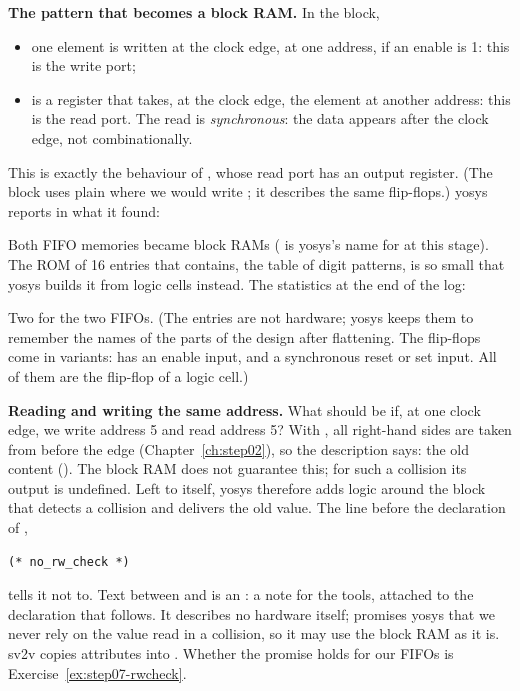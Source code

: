 \textbf{The pattern that becomes a block RAM.} In the  block,
\begin{itemize}
\item one element is written at the clock edge, at one address, if an enable
  is 1: this is the write port;
\item {} is a register that takes, at the clock edge, the element at
  another address: this is the read port. The read is \emph{synchronous}: the
  data appears after the clock edge, not combinationally.
\end{itemize}
This is exactly the behaviour of , whose read port has an
output register. (The block uses plain  where we would write
; it describes the same flip-flops.) yosys reports in
 what it found:


Both FIFO memories became block RAMs ( is yosys's name for
 at this stage). The ROM of 16 entries that 
contains, the table of digit patterns, is so small that yosys builds it from
logic cells instead. The statistics at the end of the log:


Two  for the two FIFOs. (The  entries are not
hardware; yosys keeps them to remember the names of the parts of the design
after flattening. The flip-flops come in variants:  has an enable
input,  and  a synchronous reset or set input. All of them are
the flip-flop of a logic cell.)

\textbf{Reading and writing the same address.} What should  be
if, at one clock edge, we write address 5 and read address 5? With \cc{<=},
all right-hand sides are taken from before the edge (Chapter~\ref{ch:step02}),
so the description says: the old content (). The block RAM
does not guarantee this; for such a collision its output is undefined. Left
to itself, yosys therefore adds logic around the block that detects a
collision and delivers the old value. The line before the declaration of
,
\begin{lstlisting}
(* no_rw_check *)
\end{lstlisting}
tells it not to. Text between \cc{(*} and \cc{*)} is an : a
note for the tools, attached to the declaration that follows. It describes no
hardware itself;  promises yosys that we never rely on the
value read in a collision, so it may use the block RAM as it is. sv2v copies
attributes into . Whether the promise holds for our FIFOs is
Exercise~\ref{ex:step07-rwcheck}.

